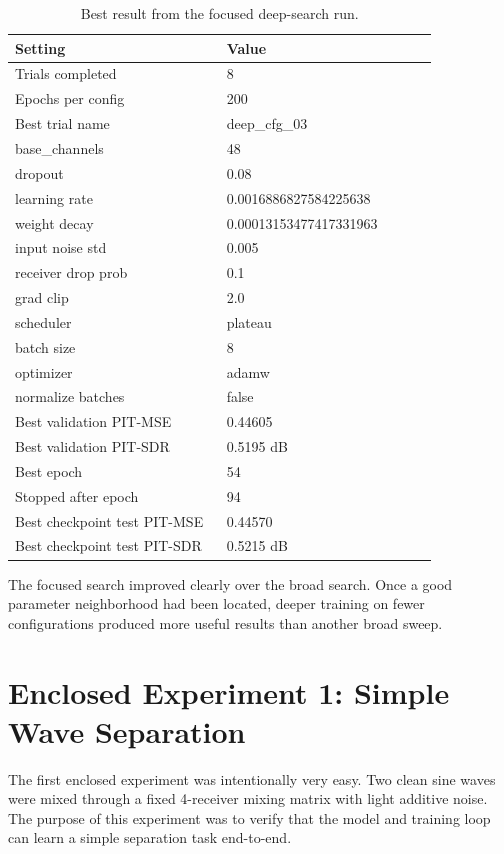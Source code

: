 \documentclass[11pt]{article}
\begin{document}
\begin{table}[H]
\centering
\caption{Best result from the focused deep-search run.}
\begin{tabular}{|p{0.42\linewidth}|p{0.42\linewidth}|}
\hline
Setting & Value \\
\hline
Trials completed & 8 \\
Epochs per config & 200 \\
Best trial name & deep\_cfg\_03 \\
base\_channels & 48 \\
dropout & 0.08 \\
learning rate & 0.0016886827584225638 \\
weight decay & 0.00013153477417331963 \\
input noise std & 0.005 \\
receiver drop prob & 0.1 \\
grad clip & 2.0 \\
scheduler & plateau \\
batch size & 8 \\
optimizer & adamw \\
normalize batches & false \\
Best validation PIT-MSE & 0.44605 \\
Best validation PIT-SDR & 0.5195 dB \\
Best epoch & 54 \\
Stopped after epoch & 94 \\
Best checkpoint test PIT-MSE & 0.44570 \\
Best checkpoint test PIT-SDR & 0.5215 dB \\
\hline
\end{tabular}
\end{table}

The focused search improved clearly over the broad search. Once a good parameter neighborhood had been located, deeper training on fewer configurations produced more useful results than another broad sweep.

\section{Enclosed Experiment 1: Simple Wave Separation}
The first enclosed experiment was intentionally very easy. Two clean sine waves were mixed through a fixed 4-receiver mixing matrix with light additive noise. The purpose of this experiment was to verify that the model and training loop can learn a simple separation task end-to-end.
\end{document}
